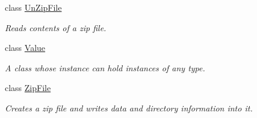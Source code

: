 \begin{DoxyCompactItemize}
class \hyperlink{classdg_1_1deepcore_1_1_un_zip_file}{Un\+Zip\+File}
\begin{DoxyCompactList}\small\item\em Reads contents of a zip file. \end{DoxyCompactList}\item 
class \hyperlink{classdg_1_1deepcore_1_1_value}{Value}
\begin{DoxyCompactList}\small\item\em A class whose instance can hold instances of any type. \end{DoxyCompactList}\item 
class \hyperlink{classdg_1_1deepcore_1_1_zip_file}{Zip\+File}
\begin{DoxyCompactList}\small\item\em Creates a zip file and writes data and directory information into it. \end{DoxyCompactList}\end{DoxyCompactItemize}
